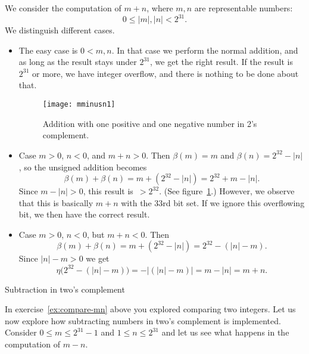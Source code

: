 We consider the computation of $m+n$, where $m,n$ are representable
numbers:
\begin{equation}
  0\leq |m|,|n|<2^{31}.
\end{equation}
We distinguish different cases.
\begin{itemize}
\item The easy case is $0<m,n$. In that case we perform the normal
  addition, and as long as the result stays under $2^{31}$, we get the
  right result. If the result is $2^{31}$ or more, we have integer
  overflow, and there is nothing to be done about that.
  \begin{figure}[ht]
    \texttt{[image: mminusn1]}
    \caption{Addition with one positive and one negative number in 2's complement.}
    \label{fig:mminusn1}
  \end{figure}
\item Case $m>0$, $n<0$, and $m+n>0$. 
  Then $\beta(m)=m$ and
  $\beta(n)=2^{32}-|n|$, so the unsigned addition becomes
  \begin{equation}
    \beta(m)+\beta(n)=m+(2^{32}-|n|)=2^{32}+m-|n|.
  \end{equation}
  Since $m-|n|>0$, this result is~$>2^{32}$.
  (See figure~\ref{fig:mminusn1}.)
  However, we observe that
  this is basically $m+n$ with the 33rd bit set. If we ignore this
  overflowing bit, we then have the correct result.
\item Case $m>0$, $n<0$, but $m+n<0$. Then
  \begin{equation}
    \beta(m)+\beta(n) = m+ (2^{32}-|n|) = 2^{32}-(|n|-m).
  \end{equation}
  Since $|n|-m>0$ we get
  \begin{equation}
    \eta\bigl(2^{32}-(|n|-m)\bigr) = -\left| (|n|-m) \right| = m-|n|=m+n.
  \end{equation}
\end{itemize}

 {Subtraction in two's complement}

In exercise~\ref{ex:compare-mn} above you explored comparing two integers.
Let us now explore how 
subtracting numbers in two's complement is implemented. Consider $0\leq
m\leq 2^{31}-1$ and $1\leq n\leq 2^{31}$ and let us see what happens
in the computation of $m-n$. 

